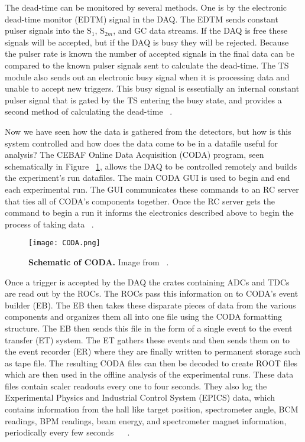 The dead-time can be monitored by several methods. One is by the electronic dead-time monitor (EDTM) signal in the DAQ. The EDTM sends constant pulser signals into the S$_1$, S$_{2m}$, and GC data streams. If the DAQ is free these signals will be accepted, but if the DAQ is busy they will be rejected. Because the pulser rate is known the number of accepted signals in the final data can be compared to the known pulser signals sent to calculate the dead-time. The TS module also sends out an electronic busy signal when it is processing data and unable to accept new triggers. This busy signal is essentially an internal constant pulser signal that is gated by the TS entering the busy state, and provides a second method of calculating the dead-time ~\cite{DAQ}. 

Now we have seen how the data is gathered from the detectors, but how is this system controlled and how does the data come to be in a datafile useful for analysis? The CEBAF Online Data Acquisition (CODA) program, seen schematically in Figure ~\ref{fig:coda}, allows the DAQ to be controlled remotely and builds the experiment's run datafiles. The main CODA GUI is used to begin and end each experimental run. The GUI communicates these commands to an RC server that ties all of CODA's components together. Once the RC server gets the command to begin a run it informs the electronics described above to begin the process of taking data ~\cite{DAQ}. 

\begin{figure}[!ht]
\begin{center}
\texttt{[image: CODA.png]}
\end{center}
\caption[Schematic of CODA]{
{\bf{Schematic of CODA.}} Image from ~\cite{DAQ}.}
\label{fig:coda}
\end{figure}

Once a trigger is accepted by the DAQ the crates containing ADCs and TDCs are read out by the ROCs. The ROCs pass this information on to CODA's event builder (EB). The EB then takes these disparate pieces of data from the various components and organizes them all into one file using the CODA formatting structure. The EB then sends this file in the form of a single event to the event transfer (ET) system. The ET gathers these events and then sends them on to the event recorder (ER) where they are finally written to permanent storage such as tape file. The resulting CODA files can then be decoded to create ROOT files which are then used in the offline analysis of the experimental runs. These data files contain scaler readouts every one to four seconds. They also log the Experimental Physics and Industrial Control System (EPICS) data, which contains information from the hall like target position, spectrometer angle, BCM readings, BPM readings, beam energy, and spectrometer magnet information, periodically every few seconds ~\cite{DAQ} ~\cite{Thesis:Ye}. 

